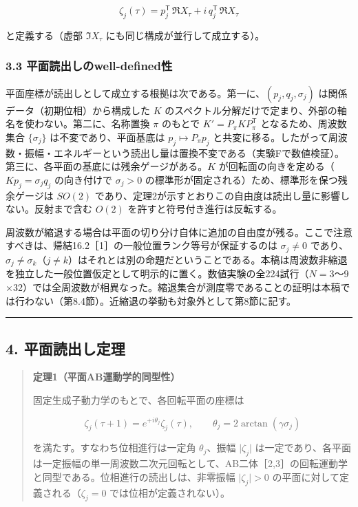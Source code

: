 \documentclass[
  a4paper,
]{ltjsarticle}
\begin{document}
\[
\zeta_j(\tau)=p_j^{\mathsf T}\,\Re X_\tau+i\,q_j^{\mathsf T}\,\Re X_\tau
\]

と定義する（虚部 \(\Im X_\tau\) にも同じ構成が並行して成立する）。

\subsubsection{3.3
平面読出しのwell-defined性}\label{ux5e73ux9762ux8aadux51faux3057ux306ewell-definedux6027}

平面座標が読出しとして成立する根拠は次である。第一に、\((p_j,q_j,\sigma_j)\)
は関係データ（初期位相）から構成した \(K\)
のスペクトル分解だけで定まり、外部の軸名を使わない。第二に、名称置換
\(\pi\) のもとで \(K'=P_\pi KP_\pi^{\mathsf T}\) となるため、周波数集合
\(\{\sigma_j\}\) は不変であり、平面基底は \(p_j\mapsto P_\pi p_j\)
と共変に移る。したがって周波数・振幅・エネルギーという読出し量は置換不変である（実験Fで数値検証）。第三に、各平面の基底には残余ゲージがある。\(K\)
が回転面の向きを定める（\(Kp_j=\sigma_jq_j\) の向き付けで \(\sigma_j>0\)
の標準形が固定される）ため、標準形を保つ残余ゲージは \(SO(2)\)
であり、定理2が示すとおりこの自由度は読出し量に影響しない。反射まで含む
\(O(2)\) を許すと符号付き進行は反転する。

周波数が縮退する場合は平面の切り分け自体に追加の自由度が残る。ここで注意すべきは、帰結16.2［1］の一般位置ランク等号が保証するのは
\(\sigma_j\ne0\)
であり、\(\sigma_j\ne\sigma_k\)（\(j\ne k\)）はそれとは別の命題だということである。本稿は周波数非縮退を独立した一般位置仮定として明示的に置く。数値実験の全224試行（\(N=3\)〜\(9\)×32）では全周波数が相異なった。縮退集合が測度零であることの証明は本稿では行わない（第8.4節）。近縮退の挙動も対象外として第8節に記す。

\begin{center}\rule{0.5\linewidth}{0.5pt}\end{center}

\subsection{4.
平面読出し定理}\label{ux5e73ux9762ux8aadux51faux3057ux5b9aux7406}

\begin{quote}
\textbf{定理1（平面AB運動学的同型性）}

固定生成子動力学のもとで、各回転平面の座標は

\[
\zeta_j(\tau+1)=e^{+i\theta_j}\zeta_j(\tau),
\qquad
\theta_j=2\arctan(\gamma\sigma_j)
\]

を満たす。すなわち位相進行は一定角 \(\theta_j\)、振幅
\(\lvert\zeta_j\rvert\)
は一定であり、各平面は一定振幅の単一周波数二次元回転として、AB二体［2,3］の回転運動学と同型である。位相進行の読出しは、非零振幅
\(\lvert\zeta_j\rvert>0\) の平面に対して定義される（\(\zeta_j=0\)
では位相が定義されない）。
\end{quote}
\end{document}
